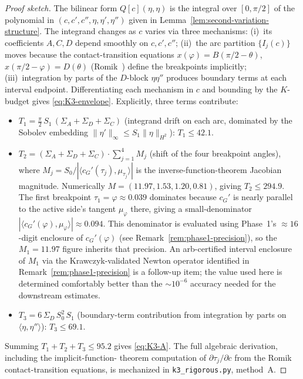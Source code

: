\begin{proof}[Proof sketch]
The bilinear form $Q[c](\eta,\eta)$ is the integral over
$[0,\pi/2]$ of the polynomial in $(c,c',c'',\eta,\eta',\eta'')$
given in Lemma~\ref{lem:second-variation-structure}. The integrand
changes as $c$ varies via three mechanisms: (i)~its coefficients
$A,C,D$ depend smoothly on $c,c',c''$; (ii)~the arc partition
$\{I_{j}(c)\}$ moves because the contact-transition equations
$x(\varphi)=B(\pi/2-\theta)$, $x(\pi/2-\varphi)=D(\theta)$
(Romik~\cite[\S4]{Romik2018}) define the breakpoints implicitly;
(iii)~integration by parts of the $D$-block $\eta\eta''$ produces
boundary terms at each interval endpoint. Differentiating each
mechanism in $c$ and bounding by the $K$-budget gives
\eqref{eq:K3-envelope}.  Explicitly, three terms contribute:
\begin{itemize}
\item $T_{1} = \tfrac{\pi}{2}\,S_{1}\,(\Sigma_{A}+\Sigma_{D}+\Sigma_{C})$
      (integrand drift on each arc, dominated by the Sobolev embedding
      $\|\eta'\|_{\infty}\leq S_{1}\|\eta\|_{H^{2}}$):  $T_{1}\leq 42.1$.
\item $T_{2} = (\Sigma_{A}+\Sigma_{D}+\Sigma_{C})\cdot
                \sum_{j=1}^{4} M_{j}$ (shift of the four breakpoint
      angles), where $M_{j} = S_{0}/|\langle c_{G}'(\tau_{j}),
      \mu_{\tau_{j}}\rangle|$ is the inverse-function-theorem Jacobian
      magnitude.  Numerically $M = (11.97, 1.53, 1.20, 0.81)$, giving
      $T_{2}\leq 294.9$.  The first breakpoint $\tau_{1} = \varphi
      \approx 0.039$ dominates because $c_{G}'$ is nearly parallel to
      the active side's tangent $\mu_{\varphi}$ there, giving a
      small-denominator $|\langle c_{G}'(\varphi), \mu_{\varphi}
      \rangle| \approx 0.094$.  This denominator is evaluated using
      Phase~1's $\approx 16$-digit enclosure of $c_{G}'(\varphi)$
      (see Remark~\ref{rem:phase1-precision}), so the
      $M_{1} = 11.97$ figure inherits that precision.  An
      arb-certified interval enclosure of $M_{1}$ via the
      Krawczyk-validated Newton operator identified in
      Remark~\ref{rem:phase1-precision} is a follow-up item; the
      value used here is determined comfortably better than the
      $\sim 10^{-6}$ accuracy needed for the downstream estimates.
\item $T_{3} = 6\,\Sigma_{D}\,S_{0}^{2}\,S_{1}$ (boundary-term
      contribution from integration by parts on $\langle\eta,
      \eta''\rangle$):  $T_{3}\leq 69.1$.
\end{itemize}
Summing $T_{1}+T_{2}+T_{3}\leq 95.2$ gives \eqref{eq:K3-A}.
The full algebraic derivation, including the implicit-function-
theorem computation of $\partial\tau_{j}/\partial c$ from the Romik
contact-transition equations, is mechanized in
\texttt{k3\_rigorous.py}, method~A.
\end{proof}

